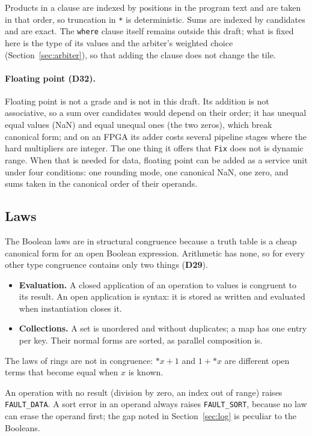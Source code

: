 \documentclass[11pt]{article}
\newcommand{\kw}[1]{\texttt{#1}}
\newcommand{\drp}[1]{{*}#1}
\newcommand{\dec}[1]{\textbf{D#1}}
\theoremstyle{definition}
\theoremstyle{remark}
\begin{document}
\medskip\noindent
Products in a clause are indexed by positions in the program text and are
taken in that order, so truncation in \kw{*} is deterministic. Sums are
indexed by candidates and are exact. The \kw{where} clause itself remains
outside this draft; what is fixed here is the type of its values and the
arbiter's weighted choice (Section~\ref{sec:arbiter}), so that adding the
clause does not change the tile.

\paragraph{Floating point (\dec{32}).} Floating point is not a grade and is
not in this draft. Its addition is not associative, so a sum over candidates
would depend on their order; it has unequal equal values (NaN) and equal
unequal ones (the two zeros), which break canonical form; and on an FPGA its
adder costs several pipeline stages where the hard multipliers are integer.
The one thing it offers that \kw{Fix} does not is dynamic range. When that
is needed for data, floating point can be added as a service unit under
four conditions: one rounding mode, one canonical NaN, one zero, and sums
taken in the canonical order of their operands.

\subsection{Laws}\label{sec:datalaws}

The Boolean laws are in structural congruence because a truth table is a
cheap canonical form for an open Boolean expression. Arithmetic has none, so
for every other type congruence contains only two things (\dec{29}).
\begin{itemize}
\item \textbf{Evaluation.} A closed application of an operation to values is
congruent to its result. An open application is syntax: it is stored as
written and evaluated when instantiation closes it.
\item \textbf{Collections.} A set is unordered and without duplicates; a map
has one entry per key. Their normal forms are sorted, as parallel
composition is.
\end{itemize}
The laws of rings are not in congruence: $\drp{x} + 1$ and $1 + \drp{x}$
are different open terms that become equal when $x$ is known.

An operation with no result (division by zero, an index out of range) raises
\kw{FAULT\_DATA}. A sort error in an operand always raises \kw{FAULT\_SORT},
because no law can erase the operand first; the gap noted in
Section~\ref{sec:log} is peculiar to the Booleans.
\end{document}
